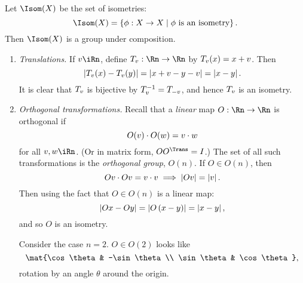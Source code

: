 \begin{corollary}
	Let $\Isom(X)$ be the set of isometries:
	\begin{equation*}
		\Isom(X) = \left\{\phi:X \to X \mid \phi \text{ is an isometry}\right\}.
	\end{equation*}
	Then $\Isom(X)$ is a group under composition. %
\end{corollary}


\begin{examples}
\mbox{}
\begin{enumerate}
	\item \emph{Translations.} If $\vv\iRn$, define $T_{\vv}:\Rn\to\Rn$ by $T_{v}(x) = x + v$. Then %
	\begin{equation*}
		\left\vert T_{v}(x) - T_{v}(y) \right\vert
		= \left\vert x+v - y-v \right\vert
		= \left\vert x-y \right\vert.
	\end{equation*}
	It is clear that $T_{v}$ is bijective by $T_{v}^{-1} = T_{-v}$, and hence $T_{v}$ is an isometry. %
	
	\item \emph{Orthogonal transformations.} Recall that a \emph{linear} map $O:\Rn\to\Rn$ is orthogonal if
	\begin{equation*}
		O(v) \cdot O(w) = v \cdot w
	\end{equation*}
	for all $\vv,\ww \iRn$. (Or in matrix form, $OO^\Trans = I$.) The set of all such transformations is the \emph{orthogonal group}, $O(n)$. If $O\in O(n)$, then
	\begin{equation*}
		Ov \cdot Ov = v \cdot v \implies \left\vert Ov \right\vert = \left\vert v \right\vert.
	\end{equation*}
	Then using the fact that $O\in O(n)$ is a linear map:
	\begin{equation*}
		\left\vert O\xx - O\yy \right\vert = \left\vert O\left( \xx-\yy \right) \right\vert = \left\vert \xx-\yy \right\vert, %
	\end{equation*}
	and so $O$ is an isometry.
	
	Consider the case $n=2$. $O\in O(2)$ looks like
	\begin{equation*}
		\mat{\cos\theta & -\sin\theta \\ \sin\theta & \cos\theta},
	\end{equation*}
	rotation by an angle $\theta$ around the origin.
	
		\pagebreak
	

\end{enumerate}
\end{examples}
